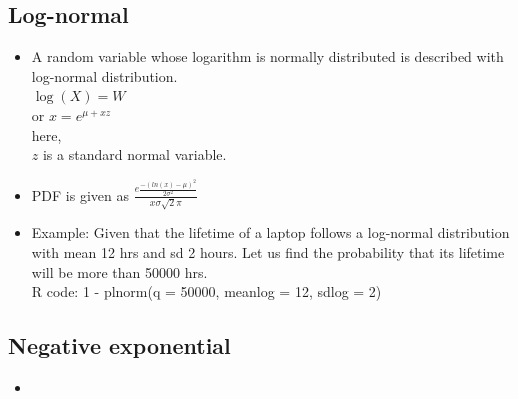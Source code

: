 \documentclass{article}
\begin{document}
\subsection{Log-normal}
\begin{itemize}
	\item A random variable whose logarithm is normally distributed is described with log-normal distribution.\\
	$\log(X)=W$\\
	or $x=e^{\mu + xz}$\\
	here,\\
	$z$ is a standard normal variable.
	\item PDF is given as 
	\mbox{\Large\(\frac{e\frac{-(ln(x)-\mu)^2}{2\sigma^2}}{x\sigma\sqrt{2}\pi}\)}
	\item Example: Given that the lifetime of a laptop follows a log-normal distribution with mean 12 hrs and sd 2 hours. Let us find the probability that its lifetime will be more than 50000 hrs.\\
	
	R code: 1 - plnorm(q = 50000, meanlog = 12, sdlog = 2)\\
	
\end{itemize}

\subsection{Negative exponential}

\begin{itemize}
	\item 
\end{itemize}
\end{document}

